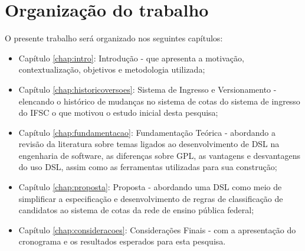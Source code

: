 \section{Organização do trabalho}
\label{organizacao}

O presente trabalho será organizado nos seguintes capítulos:

\begin{itemize}
    \item Capítulo \ref{chap:intro}: Introdução - que apresenta a motivação, contextualização, objetivos e metodologia utilizada;
    \item Capítulo \ref{chap:historicoversoes}: Sistema de Ingresso e Versionamento - elencando o histórico de mudanças no sistema de cotas do sistema de ingresso do \gls{IFSC} o que motivou o estudo inicial desta pesquisa;
    \item Capítulo \ref{chap:fundamentacao}: Fundamentação Teórica - abordando a revisão da literatura sobre temas ligados ao desenvolvimento de \gls{DSL} na engenharia de software, as diferenças sobre \gls{GPL}, as vantagens e desvantagens do uso  \gls{DSL}, assim como as ferramentas utilizadas para sua construção;
    \item Capítulo \ref{chap:proposta}: Proposta - abordando uma \gls{DSL} como meio de simplificar a especificação e desenvolvimento de regras de classificação de candidatos ao sistema de cotas da rede de ensino pública federal;
    \item Capítulo \ref{chap:consideracoes}: Considerações Finais - com a apresentação do cronograma e os resultados esperados para esta pesquisa.
\end{itemize}
